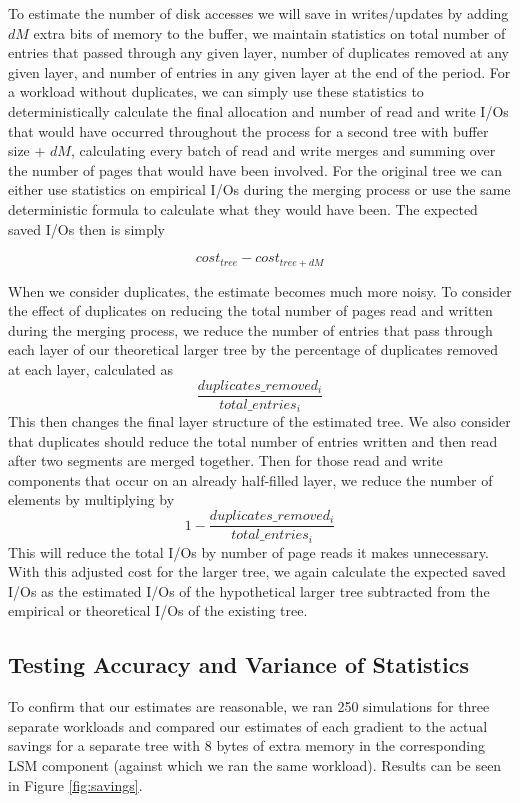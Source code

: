 \documentclass{cidr-2019}
\begin{document}
To estimate the number of disk accesses we will save in writes/updates by adding $dM$ extra bits of memory to the buffer, 
we maintain statistics on total number of entries that passed through any given layer, number of duplicates removed at any given layer, and number of entries in any given layer at the end of the period. For a workload without duplicates, we can simply
use these statistics to deterministically calculate the final allocation and number of read and write I/Os that would have
occurred throughout the process for a second tree with buffer size + $dM$, calculating every batch of read and write merges and summing over the number of pages that would have been involved. For the original tree we can either use statistics on empirical I/Os during the merging process or use the same deterministic formula to calculate what they would have been. The expected saved I/Os then is simply

$$cost_{tree} - cost_{tree+dM}$$

When we consider duplicates, the estimate becomes much more noisy. To consider the effect of duplicates on reducing the total number of pages read and written during the merging process, we reduce the number of entries that pass through each layer of our theoretical larger tree by the percentage of duplicates removed at each layer, calculated as $$\frac{duplicates\_removed_{i}}{total\_entries_{i}}$$
This then changes the final layer structure of the estimated tree. We also consider that duplicates should reduce the total number of entries written and then read after two segments are merged together. Then for those read and write components that occur on an already half-filled layer, we reduce the number of elements by multiplying by $$1 - \frac{duplicates\_removed_{i}}{total\_entries_{i}}$$
This will reduce the total I/Os by number of page reads it makes unnecessary. With this adjusted cost for the larger tree, we again calculate the expected saved I/Os as the estimated I/Os of the hypothetical larger tree subtracted from the empirical or theoretical I/Os of the existing tree.

\subsection{Testing Accuracy and Variance of Statistics}

To confirm that our estimates are reasonable, we ran 250 simulations for three
separate workloads and compared our estimates of each gradient to the actual
savings for a separate tree with 8 bytes of extra memory in the corresponding
LSM component (against which we ran the same workload). Results can be seen in
Figure \ref{fig:savings}.
\end{document}
